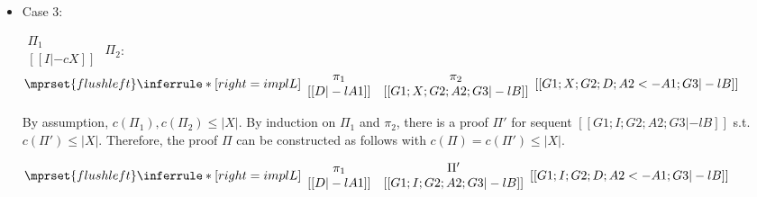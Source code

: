 \begin{itemize}
\item Case 3:
      \begin{center}
        \scriptsize
        \begin{math}
          \begin{array}{c}
            \Pi_1 \\
            {[[I |-c X]]}
          \end{array}
        \end{math}
        \qquad\qquad
        $\Pi_2$:
        \begin{math}
          $$\mprset{flushleft}
          \inferrule* [right={\tiny implL}] {
            {
              \begin{array}{cc}
                \pi_1 & \pi_2 \\
                {[[D |-l A1]]} & {[[G1; X; G2; A2; G3 |-l B]]}
              \end{array}
            }
          }{[[G1; X; G2; D; A2 <- A1; G3 |-l B]]}
        \end{math}
      \end{center}
      By assumption, $c(\Pi_1),c(\Pi_2)\leq |X|$. By induction on $\Pi_1$
      and $\pi_2$, there is a proof $\Pi'$ for sequent
      $[[G1; I; G2; A2; G3 |-l B]]$ s.t. $c(\Pi') \leq |X|$. Therefore, the
      proof $\Pi$ can be constructed as follows with
      $c(\Pi) = c(\Pi') \leq |X|$.
      \begin{center}
        \scriptsize
        \begin{math}
          $$\mprset{flushleft}
          \inferrule* [right={\tiny implL}] {
            {
              \begin{array}{cc}
                \pi_1 & \Pi' \\
                {[[D |-l A1]]} & {[[G1; I; G2; A2; G3 |-l B]]}
              \end{array}
            }
          }{[[G1; I; G2; D; A2 <- A1; G3 |-l B]]}
        \end{math}
      \end{center}


\end{itemize}
